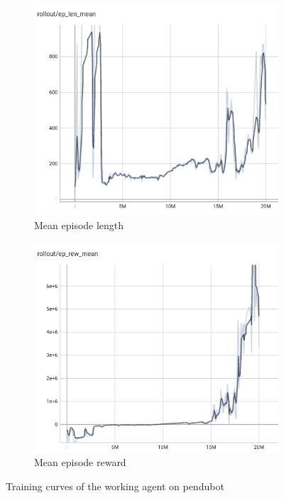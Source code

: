 \begin{figure}[H]
    \centering
    \begin{subfigure}[b]{0.45\textwidth}
        \centering
        \includegraphics[width=\textwidth]{figures/hardware_result/train_without_limit_ep_length.png}
        \caption{Mean episode length}
        \label{fig:mean episode length}
    \end{subfigure}
    \hfill %
    \begin{subfigure}[b]{0.45\textwidth}
        \centering
        \includegraphics[width=\textwidth]{figures/hardware_result/train_without_limit_ep_reward.png}
        \caption{Mean episode reward}
        \label{fig:mean episode reward}
    \end{subfigure}
    \caption{Training curves of the working agent on pendubot}
    \label{fig:training_curves_for_real_world}
\end{figure}

